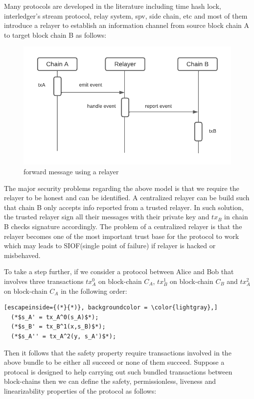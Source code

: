\documentclass[acmtog, natbib=false]{acmart}
\begin{document}
Many protocols are developed in the literature including time hash lock, interledger’s stream protocol, relay system, spv, side chain, etc and most of them introduce a relayer to establish an information channel from source block chain A to target block chain B as follows:
\begin{figure}[h]
\caption{forward message using a relayer}
\label{relayer-connection}
\includegraphics[scale=0.6]{relayer}
\end{figure}

The major security problems regarding the above model is that we require the relayer to be honest and can be identified. A centralized relayer can be build such that chain B only accepts info reported from a trusted relayer. In such solution, the trusted relayer sign all their messages with their private key and $tx_B$ in chain B checks signature accordingly. The problem of a centralized relayer is that the relayer becomes one of the most important trust base for the protocol to work which may leads to SIOF(single point of failure) if relayer is hacked or misbehaved.

To take a step further, if we consider a protocol between Alice and Bob that involves three transactions $tx_A^0$ on block-chain $C_A$, $tx_B^1$ on block-chain $C_B$ and $tx_A^2$ on block-chain $C_A$ in the following order:
\begin{lstlisting}[escapeinside={(*}{*)}, backgroundcolor = \color{lightgray},]
  (*$s_A' = tx_A^0(s_A)$*);
  (*$s_B' = tx_B^1(x,s_B)$*);
  (*$s_A'' = tx_A^2(y, s_A')$*);
\end{lstlisting}
Then it follows that the safety property require transactions involved in the above bundle to be either all succeed or none of them succeed. Suppose a protocal is designed to help carrying out such bundled transactions between block-chains then we can define the safety, permissionless, liveness and linearizability properties of the protocol as follows:
\end{document}
